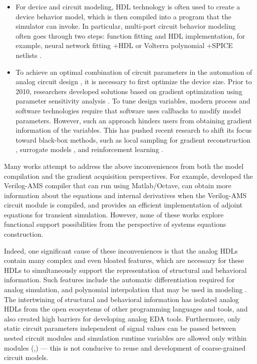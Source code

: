 \begin{itemize}[partopsep=0pt,topsep=0pt,itemsep=0pt,parsep=0pt]
	\item
	For device and circuit modeling, HDL technology is often used to create a device behavior model, which is then compiled \cite{lemaitre2002adms} into a program that the simulator can invoke. In particular, multi-port circuit behavior modeling often goes through two steps: function fitting and HDL implementation, for example, neural network fitting \cite{meijer2001neural,zhang2017artificial}+HDL or Volterra polynomial \cite{zhang2014large}+SPICE netlists \cite{zhang2019new,roymohapatra2019novel}.
	\item
	To achieve an optimal combination of circuit parameters in the automation of analog circuit design \cite{razavi2002design,silveira1996g,jespers2009gm}, it is necessary to first optimize the device size. Prior to 2010, researchers developed solutions based on gradient optimization using parameter sensitivity analysis \cite{zhan2004optimization,agrawal2006circuit}. To tune design variables, modern process and software technologies require that software uses callbacks to modify model parameters. However, such an approach hinders users from obtaining gradient information of the variables. This has pushed recent research to shift its focus toward black-box methods, such as local sampling for gradient reconstruction \cite{huang2013efficient,nieuwoudt2005multi,peng2016efficient}, surrogate models \cite{girardi2011analog,lyu2018batch,wang2014enabling,lyu2017efficient}, and reinforcement learning \cite{tang2018parametric}.
\end{itemize}
Many works attempt to address the above inconveniences from both the model compilation and the gradient acquisition perspectives. For example, \citet{mahmutoglu2018new} developed the Verilog-AMS compiler that can run using Matlab/Octave, \citet{kuthe2020verilogae} can obtain more information about the equations and internal derivatives when the Verilog-AMS circuit module is compiled, and \citet{hu2020adjoint} provides an efficient implementation of adjoint equations for transient simulation. However, none of these works explore functional support possibilities from the perspective of systems equations construction.

Indeed, one significant cause of these inconveniences is that the analog HDLs contain many complex and even bloated features, which are necessary for these HDLs to simultaneously support the representation of structural and behavioral information. Such features include the automatic differentiation required for analog simulation, and polynomial interpolation that may be used in modeling \cite[Sections 4.5.6, 9.21]{verilog2014verilog}. The intertwining of structural and behavioral information has isolated analog HDLs from the open ecosystems of other programming languages and tools, and also created high barriers for developing analog EDA tools. Furthermore, only static circuit parameters independent of signal values can be passed between nested circuit modules and simulation runtime variables are allowed only within modules (\cite[Sections 3.4, 6]{verilog2014verilog},\cite[Section 4.10]{ieee2006ieee-1364-2005}) --- this is not conducive to reuse and development of coarse-grained circuit models.

